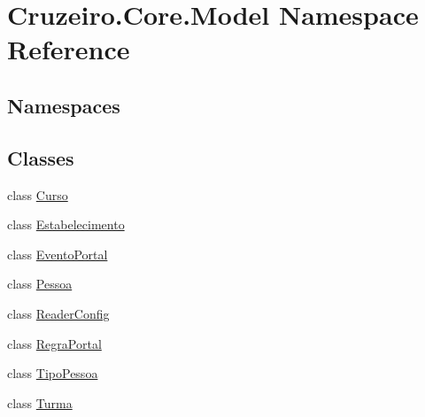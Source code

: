\hypertarget{namespace_cruzeiro_1_1_core_1_1_model}{}\section{Cruzeiro.\+Core.\+Model Namespace Reference}
\label{namespace_cruzeiro_1_1_core_1_1_model}
\subsection*{Namespaces}
\begin{DoxyCompactItemize}
\end{DoxyCompactItemize}
\subsection*{Classes}
\begin{DoxyCompactItemize}
\item 
class \hyperlink{class_cruzeiro_1_1_core_1_1_model_1_1_curso}{Curso}
\item 
class \hyperlink{class_cruzeiro_1_1_core_1_1_model_1_1_estabelecimento}{Estabelecimento}
\item 
class \hyperlink{class_cruzeiro_1_1_core_1_1_model_1_1_evento_portal}{Evento\+Portal}
\item 
class \hyperlink{class_cruzeiro_1_1_core_1_1_model_1_1_pessoa}{Pessoa}
\item 
class \hyperlink{class_cruzeiro_1_1_core_1_1_model_1_1_reader_config}{Reader\+Config}
\item 
class \hyperlink{class_cruzeiro_1_1_core_1_1_model_1_1_regra_portal}{Regra\+Portal}
\item 
class \hyperlink{class_cruzeiro_1_1_core_1_1_model_1_1_tipo_pessoa}{Tipo\+Pessoa}
\item 
class \hyperlink{class_cruzeiro_1_1_core_1_1_model_1_1_turma}{Turma}
\end{DoxyCompactItemize}
